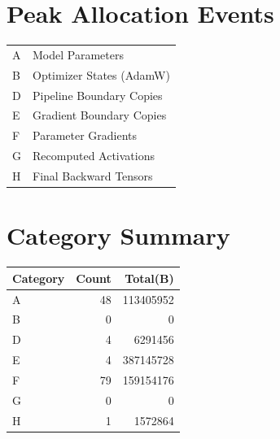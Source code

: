 \documentclass{article}
\begin{document}
\section*{Peak Allocation Events}
\small
\begin{tabular}{ll}
A & Model Parameters \\
B & Optimizer States (AdamW) \\
D & Pipeline Boundary Copies \\
E & Gradient Boundary Copies \\
F & Parameter Gradients \\
G & Recomputed Activations \\
H & Final Backward Tensors \\
\end{tabular}
\vspace{0.5em}
\section*{Category Summary}
\begin{tabular}{l r r}
Category & Count & Total(B) \\
\hline
A & 48 & 113405952 \\
B & 0 & 0 \\
D & 4 & 6291456 \\
E & 4 & 387145728 \\
F & 79 & 159154176 \\
G & 0 & 0 \\
H & 1 & 1572864 \\
\end{tabular}
\vspace{0.5em}
\end{document}

